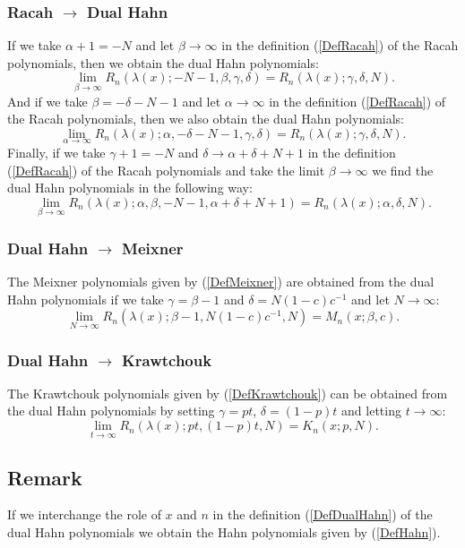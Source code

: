 \documentclass[envcountchap,graybox]{svmono}
\newcounter{rom}
\begin{document}
\subsubsection*{Racah $\rightarrow$ Dual Hahn}
If we take $\alpha+1=-N$ and let $\beta\rightarrow\infty$ in the definition (\ref{DefRacah})
of the Racah polynomials, then we obtain the dual Hahn polynomials:
$$\lim_{\beta\rightarrow\infty}
R_n(\lambda(x);-N-1,\beta,\gamma,\delta)=R_n(\lambda(x);\gamma,\delta,N).$$
And if we take $\beta=-\delta-N-1$ and let $\alpha\rightarrow\infty$ in the definition (\ref{DefRacah})
of the Racah polynomials, then we also obtain the dual Hahn polynomials:
$$\lim_{\alpha\rightarrow\infty}
R_n(\lambda(x);\alpha,-\delta-N-1,\gamma,\delta)=R_n(\lambda(x);\gamma,\delta,N).$$
Finally, if we take $\gamma+1=-N$ and $\delta\rightarrow\alpha+\delta+N+1$ in the definition
(\ref{DefRacah}) of the Racah polynomials and take the limit
$\beta\rightarrow\infty$ we find the dual Hahn polynomials in the following way:
$$\lim_{\beta\rightarrow\infty}
R_n(\lambda(x);\alpha,\beta,-N-1,\alpha+\delta+N+1)=R_n(\lambda(x);\alpha,\delta,N).$$

\subsubsection*{Dual Hahn $\rightarrow$ Meixner}
The Meixner polynomials given by (\ref{DefMeixner}) are obtained from the dual Hahn polynomials
if we take $\gamma=\beta-1$ and $\delta=N(1-c)c^{-1}$ and let $N\rightarrow\infty$:
\begin{equation}
\lim_{N\rightarrow\infty}
R_n(\lambda(x);\beta-1,N(1-c)c^{-1},N)=M_n(x;\beta,c).
\end{equation}

\subsubsection*{Dual Hahn $\rightarrow$ Krawtchouk}
The Krawtchouk polynomials given by (\ref{DefKrawtchouk}) can be obtained from the dual
Hahn polynomials by setting $\gamma=pt$, $\delta=(1-p)t$ and letting $t\rightarrow\infty$:
\begin{equation}
\lim_{t\rightarrow\infty}R_n(\lambda(x);pt,(1-p)t,N)=K_n(x;p,N).
\end{equation}

\subsection*{Remark}
If we interchange the role of $x$ and $n$ in the definition (\ref{DefDualHahn})
of the dual Hahn polynomials we obtain the Hahn polynomials given by (\ref{DefHahn}).
\end{document}
